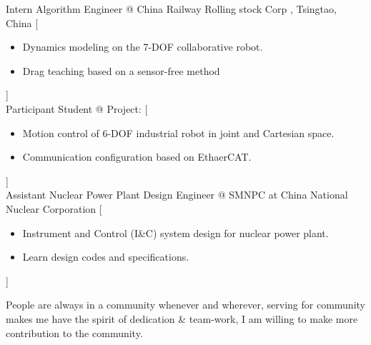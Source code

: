 \documentclass{resume}
\begin{document}
\begin{experiences}
    { Intern Algorithm Engineer @ China Railway Rolling stock Corp , Tsingtao, China}%
    [\begin{itemize}
      \item Dynamics modeling on the 7-DOF collaborative robot.
      \item Drag teaching based on a sensor-free method
    \end{itemize}]\\

  \separator{0.5ex}
    {Participant Student @ Project: }%
    [\begin{itemize}
      \item Motion control of 6-DOF industrial robot in joint and Cartesian space.
      \item Communication configuration based on EthaerCAT.
    \end{itemize}]\\
    
    \separator{0.5ex}
    {Assistant Nuclear Power Plant Design Engineer @ SMNPC at China National Nuclear Corporation }%
    [\begin{itemize}
      \item Instrument and Control (I\&C) system design for  nuclear power plant.
      \item Learn design codes and specifications.
    \end{itemize}]
    
\end{experiences}


People are always in a community whenever and wherever, serving for community makes me have the spirit of dedication \& team-work, I am willing to make more contribution to the community.
 
\begin{competences}[6em]

\end{competences}
\end{document}

